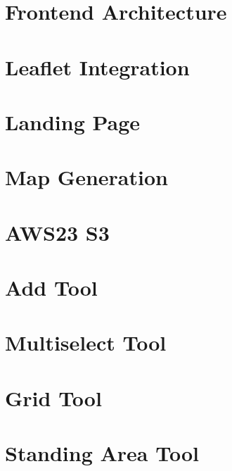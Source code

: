 \section{Frontend Architecture}


\section{Leaflet Integration}


\section{Landing Page}


\section{Map Generation}


\section{AWS23 S3}


\section{Add Tool}


\section{Multiselect Tool}


\section{Grid Tool}
\label{sec:grid-tool}


\section{Standing Area Tool}

